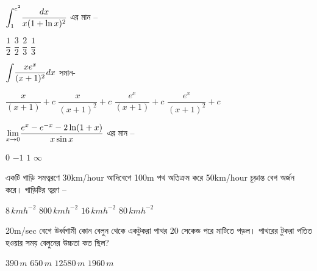 \documentclass[addpoints]{exam}
\begin{document}
\begin{questions}
\question $ \mathlarger{\int_{1}^{e^{2}}}\dfrac{dx}{x(1+\ln x)^{2}} $  এর মান – 

\begin{oneparchoices}
\choice $ \dfrac{1}{2} $
\choice $ \dfrac{3}{2} $
\choice $ \dfrac{2}{3} $
\choice $ \dfrac{1}{3} $

\end{oneparchoices}

\question $ \mathlarger{\int}\dfrac{xe^{x}}{(x+1)^{2}}dx $ সমান-

\begin{oneparchoices}
\choice $ \dfrac{x}{(x+1)}+c $
\choice $ \dfrac{x}{(x+1)^{2}}+c $
\choice $ \dfrac{e^{x}}{(x+1)}+c $
\choice $ \dfrac{e^{x}}{(x+1)^{2}}+c $
\end{oneparchoices}

\question $ \mathlarger{\lim_{x\to 0}}\dfrac{e^{x}-e^{-x}-2\ln (1+x)}{x\sin x} $  এর মান – 

\begin{oneparchoices}
\choice $ 0 $
\choice $ -1 $
\choice $ 1 $
\choice $ \infty $

\end{oneparchoices}

\question একটি গাড়ি সমত্বরণে 30km/hour আদিবেগে 100m পথ অতিক্রম করে 50km/hour চূড়ান্ত বেগ অর্জন করে। গাড়িটির ত্বরণ –

\begin{oneparchoices}
\choice $ 8\,kmh^{-2}$
\choice $ 800\,kmh^{-2}$
\choice $ 16\,kmh^{-2}$
\choice $ 80\,kmh^{-2}$

\end{oneparchoices}

\question  20m/sec বেগে উর্ধ্বগামী কোন বেলুন থেকে একটুকরা পাথর 20 সেকেন্ড পরে মাটিতে পড়ল। পাথরের টুকরা পতিত হওয়ার সময় বেলুনের উচ্চতা কত ছিল? 

\begin{oneparchoices}
\choice $ 390\,m $
\choice $ 650\,m $
\choice $ 12580\,m $
\choice $ 1960\,m $

\end{oneparchoices}

\end{questions}
\end{document}
